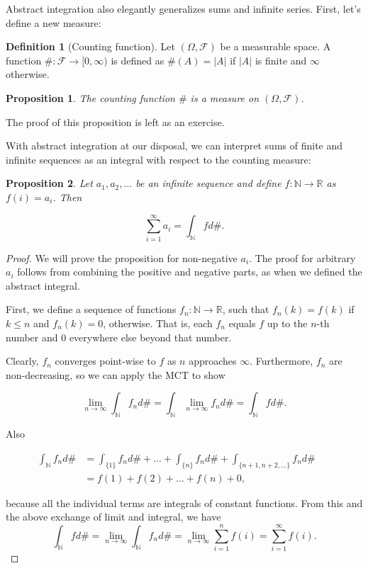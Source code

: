\documentclass{book}
\theoremstyle{plain}%
\newtheorem{proposition}{Proposition}[section]
\theoremstyle{definition}
\newtheorem{definition}{Definition}[section]
\newlength{\arrow}
\begin{document}
Abstract integration also elegantly generalizes sums and infinite series. First, let's define a new measure:

\begin{definition}[Counting function] Let $(\Omega, \mathcal{F})$ be a measurable space. A function $\#:\mathcal{F} \longrightarrow [0,\infty)$ is defined as $\#(A) = |A|$ if $|A|$ is finite and $\infty$ otherwise.
\end{definition}

\begin{proposition}
The counting function $\#$ is a measure on $(\Omega, \mathcal{F})$.\label{prop:counting}
\end{proposition}

The proof of this proposition is left as an exercise.

With abstract integration at our disposal, we can interpret sums of finite and infinite sequences as an integral with respect to the counting measure:

\begin{proposition} Let $a_1, a_2, ...$ be an infinite sequence and define $f: \mathbb{N} \longrightarrow \mathbb{R}$ as $f(i) = a_i$. Then

$$\sum_{i=1}^\infty a_i = \int_\mathbb{N} f d\#.$$
\end{proposition}

\begin{proof} We will prove the proposition for non-negative $a_i$. The proof for arbitrary $a_i$ follows from combining the positive and negative parts, as when we defined the abstract integral.

First, we define a sequence of functions $f_n: \mathbb{N} \longrightarrow \mathbb{R}$, such that $f_n(k) = f(k)$ if $k \leq n$ and $f_n(k) = 0$, otherwise. That is, each $f_n$ equals $f$ up to the $n$-th number and 0 everywhere else beyond that number.

Clearly, $f_n$ converges point-wise to $f$ as $n$ approaches $\infty$. Furthermore, $f_n$ are non-decreasing, so we can apply the MCT to show

$$\lim_{n \rightarrow \infty} \int_\mathbb{N} f_n d\# = \int_\mathbb{N} \lim_{n \rightarrow \infty} f_n d\# = \int_\mathbb{N} f d\#.$$

Also

\begin{align*}
    \int_\mathbb{N} f_n d\# &= \int_{\{1\}} f_n d\# + \dots + \int_{\{n\}} f_n d\# + \int_{\{n+1, n+2, \dots\}} f_n d\# && \text{}\\
    &= f(1) + f(2) + \dots + f(n) + 0, &&
\end{align*}

because all the individual terms are integrals of constant functions. From this and the above exchange of limit and integral, we have $$\int_\mathbb{N} f d\# =\lim_{n \rightarrow \infty} \int_\mathbb{N} f_n d\# = \lim_{n \rightarrow \infty} \sum_{i=1}^n f(i) = \sum_{i=1}^\infty f(i).$$

\end{proof}
\end{document}
